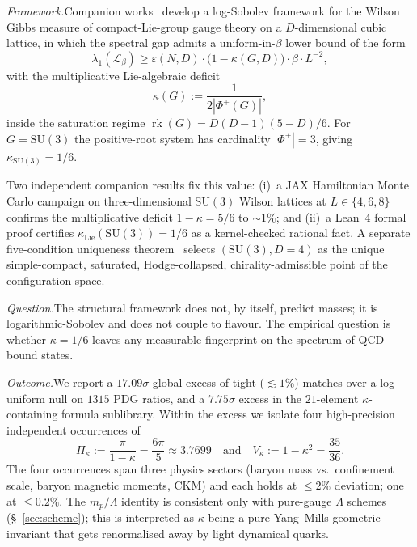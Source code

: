 \documentclass[aps,prl,reprint,amsmath,amssymb,nofootinbib,floatfix,superscriptaddress]{revtex4-2}
\newcommand{\calL}{\mathcal{L}}
\newcommand{\rk}{\operatorname{rk}}
\newcommand{\SU}{\mathrm{SU}}
\newcommand{\Piskappa}{\Pi_{\kappa}}
\newcommand{\Vskappa}{V_{\kappa}}
\newcommand{\Phiroots}{\Phi^{+}}
\begin{document}
\textit{Framework.}\quad Companion works~\cite{Remondiere2026a,Remondiere2026b} develop a log-Sobolev framework for the Wilson Gibbs measure of compact-Lie-group gauge theory on a $D$-dimensional cubic lattice, in which the spectral gap admits a uniform-in-$\beta$ lower bound of the form
\begin{equation}
\lambda_1(\calL_\beta) \ge \varepsilon(N, D) \cdot \big(1 - \kappa(G, D)\big) \cdot \beta \cdot L^{-2},
\label{eq:lsi}
\end{equation}
with the multiplicative Lie-algebraic deficit
\begin{equation}
\kappa(G) := \frac{1}{2 |\Phiroots(G)|},
\label{eq:kappa-def}
\end{equation}
inside the saturation regime $\rk(G) = D(D-1)(5-D)/6$. For $G = \SU(3)$ the positive-root system has cardinality $|\Phiroots| = 3$, giving $\kappa_{\SU(3)} = 1/6$.

Two independent companion results fix this value: (i)~a JAX Hamiltonian Monte Carlo campaign on three-dimensional $\SU(3)$ Wilson lattices at $L \in \{4, 6, 8\}$ confirms the multiplicative deficit $1 - \kappa = 5/6$ to ${\sim}1\%$; and (ii)~a Lean~4 formal proof certifies $\kappa_{\mathrm{Lie}}(\SU(3)) = 1/6$ as a kernel-checked rational fact. A separate five-condition uniqueness theorem~\cite{Remondiere2026a} selects $(\SU(3), D{=}4)$ as the unique simple-compact, saturated, Hodge-collapsed, chirality-admissible point of the configuration space.

\textit{Question.}\quad The structural framework does not, by itself, predict masses; it is logarithmic-Sobolev and does not couple to flavour. The empirical question is whether $\kappa = 1/6$ leaves any measurable fingerprint on the spectrum of QCD-bound states.

\textit{Outcome.}\quad We report a $17.09\sigma$ global excess of tight ($\lesssim 1\%$) matches over a log-uniform null on $1315$ PDG ratios, and a $7.75\sigma$ excess in the $21$-element $\kappa$-containing formula sublibrary. Within the excess we isolate four high-precision independent occurrences of
\begin{equation}
\Piskappa := \frac{\pi}{1 - \kappa} = \frac{6\pi}{5} \approx 3.7699
\quad\text{and}\quad
\Vskappa := 1 - \kappa^{2} = \frac{35}{36}.
\label{eq:two-structural}
\end{equation}
The four occurrences span three physics sectors (baryon mass vs.\ confinement scale, baryon magnetic moments, CKM) and each holds at $\le 2\%$ deviation; one at $\le 0.2\%$. The $m_p/\Lambda$ identity is consistent only with pure-gauge $\Lambda$ schemes (\S~\ref{sec:scheme}); this is interpreted as $\kappa$ being a pure-Yang--Mills geometric invariant that gets renormalised away by light dynamical quarks.
\end{document}
